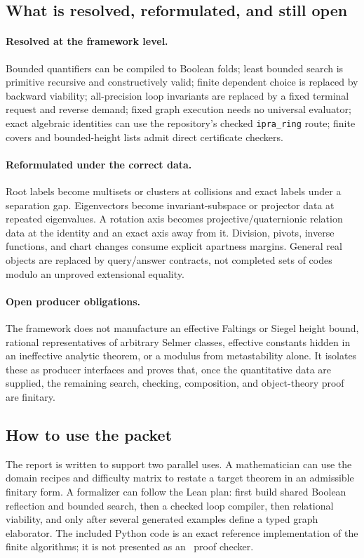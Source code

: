\subsection{What is resolved, reformulated, and still open}

\paragraph{Resolved at the framework level.}
Bounded quantifiers can be compiled to Boolean folds; least bounded search is primitive recursive and constructively valid; finite dependent choice is replaced by backward viability; all-precision loop invariants are replaced by a fixed terminal request and reverse demand; fixed graph execution needs no universal evaluator; exact algebraic identities can use the repository's checked \texttt{ipra\_ring} route; finite covers and bounded-height lists admit direct certificate checkers.

\paragraph{Reformulated under the correct data.}
Root labels become multisets or clusters at collisions and exact labels under a separation gap.  Eigenvectors become invariant-subspace or projector data at repeated eigenvalues.  A rotation axis becomes projective/quaternionic relation data at the identity and an exact axis away from it.  Division, pivots, inverse functions, and chart changes consume explicit apartness margins.  General real objects are replaced by query/answer contracts, not completed sets of codes modulo an unproved extensional equality.

\paragraph{Open producer obligations.}
The framework does not manufacture an effective Faltings or Siegel height bound, rational representatives of arbitrary Selmer classes, effective constants hidden in an ineffective analytic theorem, or a modulus from metastability alone.  It isolates these as producer interfaces and proves that, once the quantitative data are supplied, the remaining search, checking, composition, and object-theory proof are finitary.

\subsection{How to use the packet}

The report is written to support two parallel uses.  A mathematician can use the domain recipes and difficulty matrix to restate a target theorem in an admissible finitary form.  A formalizer can follow the Lean plan: first build shared Boolean reflection and bounded search, then a checked loop compiler, then relational viability, and only after several generated examples define a typed graph elaborator.  The included Python code is an exact reference implementation of the finite algorithms; it is not presented as an \iPRA\ proof checker.
